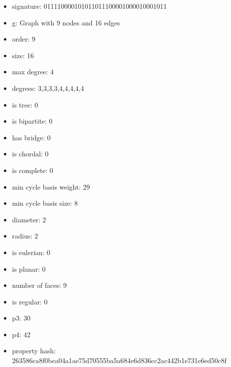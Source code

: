 \newpage
\begin{figure}
\end{figure}
\begin{itemize}
\item signature: 011110000101011011100001000010001011
\item g: Graph with 9 nodes and 16 edges
\item order: 9
\item size: 16
\item max degree: 4
\item degrees: 3,3,3,3,4,4,4,4,4
\item is tree: 0
\item is bipartite: 0
\item has bridge: 0
\item is chordal: 0
\item is complete: 0
\item min cycle basis weight: 29
\item min cycle basis size: 8
\item diameter: 2
\item radius: 2
\item is eulerian: 0
\item is planar: 0
\item number of faces: 9
\item is regular: 0
\item p3: 30
\item p4: 42
\item property hash: 263586ca8f0bea04a1ae75d70555ba5a684e6d836cc2ac442b1e731e6ed50c8f
\end{itemize}
